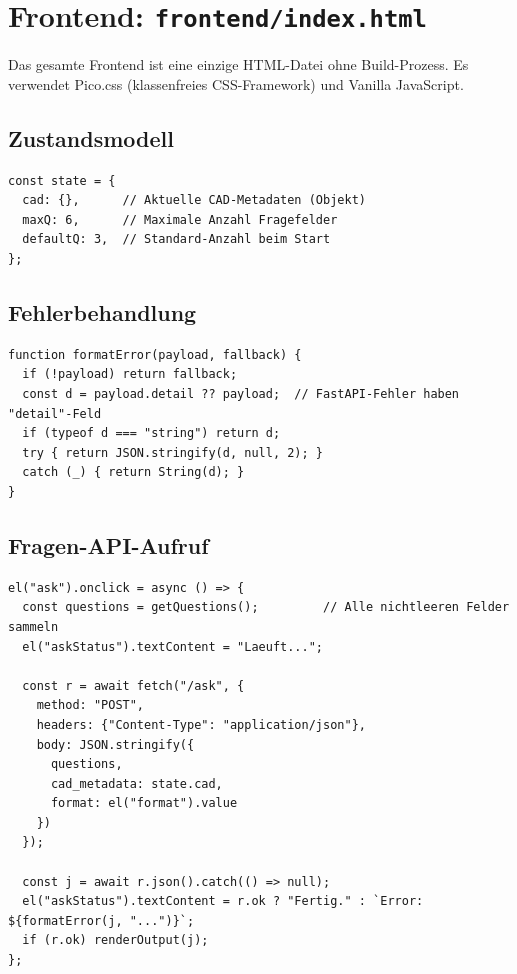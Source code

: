 \documentclass[12pt, a4paper]{article}
\begin{document}
\newpage
\section{Frontend: \texttt{frontend/index.html}}

Das gesamte Frontend ist eine einzige HTML-Datei ohne Build-Prozess.
Es verwendet Pico.css (klassenfreies CSS-Framework) und Vanilla JavaScript.

\subsection{Zustandsmodell}

\begin{lstlisting}[style=pythonstyle, caption={JavaScript-Zustandsmodell}]
const state = {
  cad: {},      // Aktuelle CAD-Metadaten (Objekt)
  maxQ: 6,      // Maximale Anzahl Fragefelder
  defaultQ: 3,  // Standard-Anzahl beim Start
};
\end{lstlisting}

\subsection{Fehlerbehandlung}

\begin{lstlisting}[style=pythonstyle, caption={Fehlerdarstellung (JavaScript)}]
function formatError(payload, fallback) {
  if (!payload) return fallback;
  const d = payload.detail ?? payload;  // FastAPI-Fehler haben "detail"-Feld
  if (typeof d === "string") return d;
  try { return JSON.stringify(d, null, 2); }
  catch (_) { return String(d); }
}
\end{lstlisting}

\subsection{Fragen-API-Aufruf}

\begin{lstlisting}[style=pythonstyle, caption={Frontend-Aufruf der /ask-API}]
el("ask").onclick = async () => {
  const questions = getQuestions();         // Alle nichtleeren Felder sammeln
  el("askStatus").textContent = "Laeuft...";

  const r = await fetch("/ask", {
    method: "POST",
    headers: {"Content-Type": "application/json"},
    body: JSON.stringify({
      questions,
      cad_metadata: state.cad,
      format: el("format").value
    })
  });

  const j = await r.json().catch(() => null);
  el("askStatus").textContent = r.ok ? "Fertig." : `Error: ${formatError(j, "...")}`;
  if (r.ok) renderOutput(j);
};
\end{lstlisting}
\end{document}
